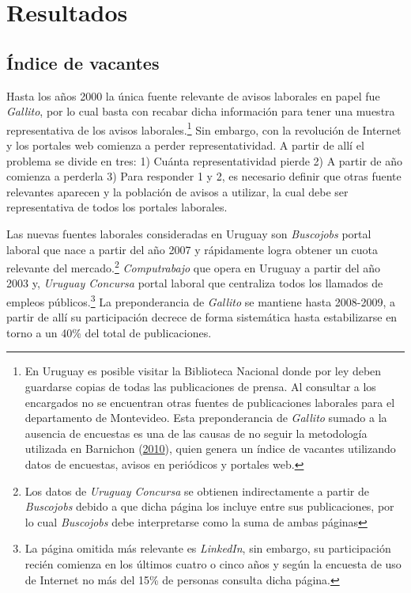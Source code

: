 \documentclass[12pt,oneside]{reedthesis}
\begin{document}
\hypertarget{cap:Resultados}{%
\chapter{Resultados}\label{cap:Resultados}}

\hypertarget{uxedndice-de-vacantes}{%
\section{Índice de vacantes}\label{uxedndice-de-vacantes}}

Hasta los años 2000 la única fuente relevante de avisos laborales en papel fue \emph{Gallito}, por lo cual basta con recabar dicha información para tener una muestra representativa de los avisos laborales.\footnote{En Uruguay es posible visitar la Biblioteca Nacional donde por ley deben guardarse copias de todas las publicaciones de prensa. Al consultar a los encargados no se encuentran otras fuentes de publicaciones laborales para el departamento de Montevideo. Esta preponderancia de \emph{Gallito} sumado a la ausencia de encuestas es una de las causas de no seguir la metodología utilizada en Barnichon (\protect\hyperlink{ref-Barnichon2010}{2010}), quien genera un índice de vacantes utilizando datos de encuestas, avisos en periódicos y portales web.} Sin embargo, con la revolución de Internet y los portales web comienza a perder representatividad. A partir de allí el problema se divide en tres: 1) Cuánta representatividad pierde 2) A partir de año comienza a perderla 3) Para responder 1 y 2, es necesario definir que otras fuente relevantes aparecen y la población de avisos a utilizar, la cual debe ser representativa de todos los portales laborales.

Las nuevas fuentes laborales consideradas en Uruguay son \emph{Buscojobs} portal laboral que nace a partir del año 2007 y rápidamente logra obtener un cuota relevante del mercado.\footnote{Los datos de \emph{Uruguay Concursa} se obtienen indirectamente a partir de \emph{Buscojobs} debido a que dicha página los incluye entre sus publicaciones, por lo cual \emph{Buscojobs} debe interpretarse como la suma de ambas páginas} \emph{Computrabajo} que opera en Uruguay a partir del año 2003 y, \emph{Uruguay Concursa} portal laboral que centraliza todos los llamados de empleos públicos.\footnote{La página omitida más relevante es \emph{LinkedIn}, sin embargo, su participación recién comienza en los últimos cuatro o cinco años y según la encuesta de uso de Internet no más del 15\% de personas consulta dicha página.} La preponderancia de \emph{Gallito} se mantiene hasta 2008-2009, a partir de allí su participación decrece de forma sistemática hasta estabilizarse en torno a un 40\% del total de publicaciones.
\end{document}
